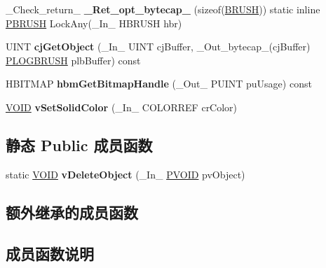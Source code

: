 \begin{DoxyCompactItemize}
\item 
\mbox{\label{class_b_r_u_s_h_a3370ec70002d28750571ebb95468763f}} 
\+\_\+\+Check\+\_\+return\+\_\+ {\bfseries \+\_\+\+Ret\+\_\+opt\+\_\+bytecap\+\_\+} (sizeof(\hyperlink{class_b_r_u_s_h}{B\+R\+U\+SH})) static inline \hyperlink{struct___b_r_u_s_h}{P\+B\+R\+U\+SH} Lock\+Any(\+\_\+\+In\+\_\+ H\+B\+R\+U\+SH hbr)
\item 
\mbox{\label{class_b_r_u_s_h_a893f2c21a5b4cc30e12c14f0280122b9}} 
U\+I\+NT {\bfseries cj\+Get\+Object} (\+\_\+\+In\+\_\+ U\+I\+NT cj\+Buffer, \+\_\+\+Out\+\_\+bytecap\+\_\+(cj\+Buffer) \hyperlink{structtag_l_o_g_b_r_u_s_h}{P\+L\+O\+G\+B\+R\+U\+SH} plb\+Buffer) const
\item 
\mbox{\label{class_b_r_u_s_h_aa6bb6b6ad47298d97ce48b0e420927b1}} 
H\+B\+I\+T\+M\+AP {\bfseries hbm\+Get\+Bitmap\+Handle} (\+\_\+\+Out\+\_\+ P\+U\+I\+NT pu\+Usage) const
\item 
\mbox{\label{class_b_r_u_s_h_abffdf07d1afbba309acef7b572528c9c}} 
\hyperlink{interfacevoid}{V\+O\+ID} {\bfseries v\+Set\+Solid\+Color} (\+\_\+\+In\+\_\+ C\+O\+L\+O\+R\+R\+EF cr\+Color)
\end{DoxyCompactItemize}
\subsection*{静态 Public 成员函数}
\begin{DoxyCompactItemize}
\item 
\mbox{\label{class_b_r_u_s_h_ab6f973acdb90c4bb492de73041ba4a62}} 
static \hyperlink{interfacevoid}{V\+O\+ID} {\bfseries v\+Delete\+Object} (\+\_\+\+In\+\_\+ \hyperlink{interfacevoid}{P\+V\+O\+ID} pv\+Object)
\end{DoxyCompactItemize}
\subsection*{额外继承的成员函数}


\subsection{成员函数说明}
\mbox{\label{class_b_r_u_s_h_a457266c039301ff0c938f1fee80544c1}} 
